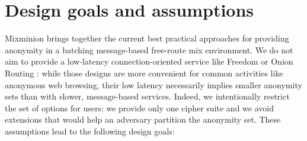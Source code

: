 \documentclass[final]{ieee}
\begin{document}





\section{Design goals and assumptions}
\label{sec:assumptions}

Mixminion brings together the current best practical approaches
for providing anonymity in a batching message-based free-route mix
environment. We do not aim to provide a low-latency connection-oriented
service like Freedom \cite{freedom} or Onion Routing \cite{syverson_2000}:
while those designs are more convenient for common activities like
anonymous web browsing, their low latency necessarily implies smaller
anonymity sets than with slower, message-based services. Indeed, we
intentionally restrict the set of options for users: we provide only one
cipher suite and we avoid extensions that would help an adversary partition
the anonymity set. These assumptions lead to the following design goals:
\end{document}
